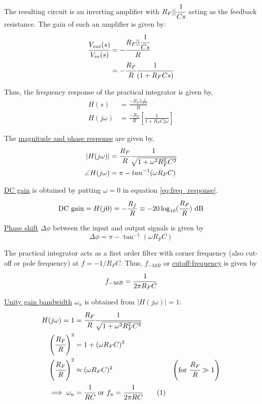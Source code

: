 \documentclass[12pt, titlepage]{article}
\theoremstyle{definition}
\newcommand\numberthis{\addtocounter{equation}{1}\tag{\theequation}}
\begin{document}
    The resulting circuit is an inverting amplifier with $R_F||\cfrac{1}{Cs}$ acting as the feedback resistance.
    The gain of such an amplifier is given by:
    \begin{align*}
      \cfrac{V_{out}(s)}{V_{in}(s)} &= - \cfrac{R_F||\cfrac{1}{Cs}}{R}\\
      &= - \cfrac{R_F}{R} \cfrac{1}{(1 + R_F Cs)}
    \end{align*}

    Thus, the frequency response of the practical integrator is given by,
    \begin{align}
      H(s) &= \frac{-R_{F} || \frac{1}{Cs}}{R} \\
      H(j\omega) &= \frac{-R_{F}}{R} \left[ \frac{1}{1+R_{F}Cj\omega} \right] \label{eq:freq_response}
    \end{align}

    The \underline{magnitude and phase response} are given by,
    \begin{align*}
    |H(j\omega)| &= \cfrac{R_{F}}{R}\cfrac{1}{\sqrt{1+\omega^{2}R_{F}^{2}C^{2}}} \\
    \angle H(j\omega) &= \pi - tan^{-1}(\omega R_{F}C)
    \end{align*}

    \underline{DC gain} is obtained by putting $\omega = 0$ in equation \ref{eq:freq_response}.
    \begin{equation}
      \text{DC gain} = H(j0) = -\frac{R_f}{R} \equiv -20\log_{10}(\cfrac{R_F}{R}) \text{ dB}
    \end{equation}

    \underline{Phase shift} $\Delta\phi$ between the input and output signals is given by
    \begin{equation}\label{eq:phase_shift}
      \Delta\phi = \pi - \tan^{-1}(\omega R_FC)
    \end{equation}

    The practical integrator acts as a first order filter with corner frequency (also cut-off or pole frequency) at $f = -1/R_FC$.
    Thus, \underline{$f_{-3dB}$} or \underline{cutoff-frequency} is given by
    \begin{equation}\label{eq:f3db}
      f_{-3dB} = \cfrac{1}{2\pi R_FC}
    \end{equation}

    \underline{Unity gain bandwidth} $\omega_u$ is obtained from $|H(j\omega)| = 1$:
    \begin{align*}
      H(j\omega) = 1 &= \cfrac{R_{F}}{R}\cfrac{1}{\sqrt{1+\omega^{2}R_{F}^{2}C^{2}}} \\
      \left(\cfrac{R_F}{R}\right)^2 &= 1 + (\omega R_FC)^2 \\
      \left(\cfrac{R_F}{R}\right)^2 &\approx (\omega R_FC)^2 & \left(\text{for } \cfrac{R_F}{R} \gg 1\right)\\
      \implies \omega_u &= \cfrac{1}{RC} \text{ or } f_u = \cfrac{1}{2\pi RC}\numberthis \label{eq:unity_gain_bw}
    \end{align*}
\end{document}
